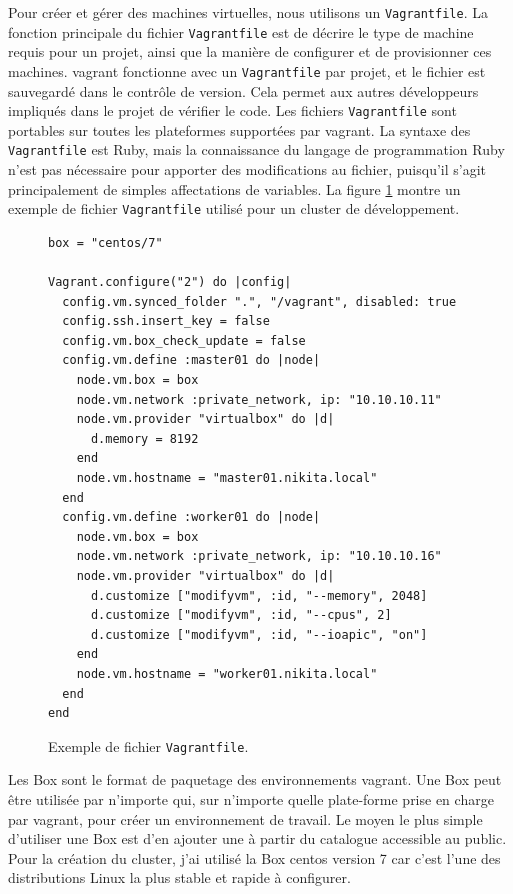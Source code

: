 \documentclass[12pt, french]{report}
\begin{document}
Pour créer et gérer des machines virtuelles, nous utilisons un \texttt{Vagrantfile}. La fonction principale du fichier \texttt{Vagrantfile} est de décrire le type de machine requis pour un projet, ainsi que la manière de configurer et de provisionner ces machines. \gls{vagrant} fonctionne avec un \texttt{Vagrantfile} par projet, et le fichier est sauvegardé dans le contrôle de version. Cela permet aux autres développeurs impliqués dans le projet de vérifier le code. Les fichiers \texttt{Vagrantfile} sont portables sur toutes les plateformes supportées par \gls{vagrant}. La syntaxe des \texttt{Vagrantfile} est Ruby, mais la connaissance du langage de programmation Ruby n'est pas nécessaire pour apporter des modifications au fichier, puisqu'il s'agit principalement de simples affectations de variables. La figure \ref{fig:example-vagrantfile} montre un exemple de fichier \texttt{Vagrantfile} utilisé pour un cluster de développement.

\begin{figure}[h]
\begin{verbatim}
box = "centos/7"

Vagrant.configure("2") do |config|
  config.vm.synced_folder ".", "/vagrant", disabled: true
  config.ssh.insert_key = false
  config.vm.box_check_update = false
  config.vm.define :master01 do |node|
    node.vm.box = box
    node.vm.network :private_network, ip: "10.10.10.11"
    node.vm.provider "virtualbox" do |d|
      d.memory = 8192
    end
    node.vm.hostname = "master01.nikita.local"
  end
  config.vm.define :worker01 do |node|
    node.vm.box = box
    node.vm.network :private_network, ip: "10.10.10.16"
    node.vm.provider "virtualbox" do |d|
      d.customize ["modifyvm", :id, "--memory", 2048]
      d.customize ["modifyvm", :id, "--cpus", 2]
      d.customize ["modifyvm", :id, "--ioapic", "on"]
    end
    node.vm.hostname = "worker01.nikita.local"
  end
end
\end{verbatim}
\centering
\caption{Exemple de fichier \texttt{Vagrantfile}.}
\label{fig:example-vagrantfile}
\end{figure}

Les Box sont le format de paquetage des environnements \gls{vagrant}. Une Box peut être utilisée par n'importe qui, sur n'importe quelle plate-forme prise en charge par \gls{vagrant}, pour créer un environnement de travail. Le moyen le plus simple d'utiliser une Box est d'en ajouter une à partir du catalogue accessible au public. Pour la création du cluster, j'ai utilisé la Box \gls{centos} version 7 car c'est l'une des distributions Linux la plus stable et rapide à configurer.
\end{document}
